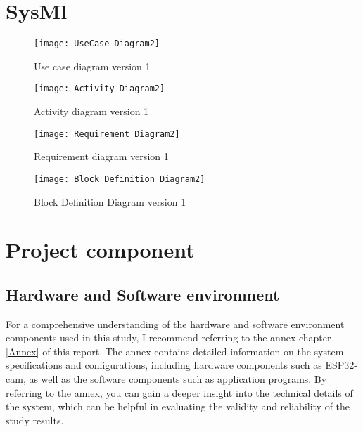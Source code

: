 \section{SysMl}

\FloatBarrier
\begin{figure}[h]

         \centering
        \texttt{[image: UseCase Diagram2]}
   
        \caption{Use case diagram version 1}
        \label{Use case diagram version 1}

    \end{figure}


\FloatBarrier
\FloatBarrier
\begin{figure}[h]
\FloatBarrier
         \centering
        \texttt{[image: Activity Diagram2]}
   
        \caption{Activity diagram version 1}
        \label{Activity diagram version 1}
\FloatBarrier
    \end{figure}


\FloatBarrier

\FloatBarrier
\begin{figure}[h]
\FloatBarrier
         \centering
        \texttt{[image: Requirement Diagram2]}
   
        \caption{Requirement diagram version 1}
        \label{Requirement diagram version 1}
\FloatBarrier
    \end{figure}


\FloatBarrier
\FloatBarrier
\begin{figure}[h]
\FloatBarrier
         \centering
        \texttt{[image: Block Definition Diagram2]}
   
        \caption{Block Definition Diagram version 1}
        \label{Block Definition Diagram version 1}
\FloatBarrier
    \end{figure}


\FloatBarrier

\section{Project component}
\subsection{Hardware and Software environment}
For a comprehensive understanding of the hardware and software environment components used in this study, I recommend referring to the annex chapter \ref{Annex} of this report. The annex contains detailed information on the system specifications and configurations, including hardware components such as ESP32-cam, as well as the software components such as  application programs. By referring to the annex, you can gain a deeper insight into the technical details of the system, which can be helpful in evaluating the validity and reliability of the study results.






